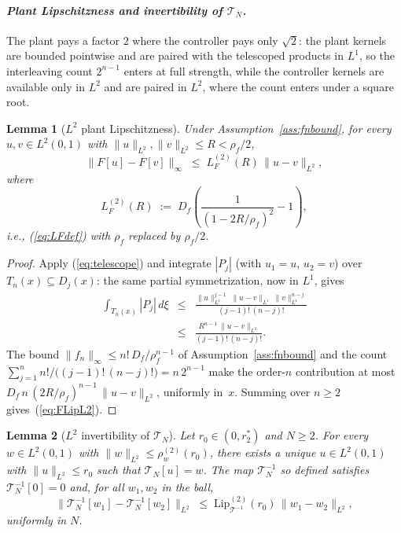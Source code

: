 \documentclass[10pt,a4paper]{amsart}
\newtheorem{lemma}{Lemma}
\newcommand{\Tcal}{\mathcal{T}}
\newcommand{\Ltwo}{L^2}
\newcommand{\LipT}{\mathrm{Lip}_{\Tcal^{-1}}}
\begin{document}
\paragraph*{\normalfont\em Plant Lipschitzness and invertibility of $\Tcal_N$.}
The plant pays a factor $2$ where the controller pays only $\sqrt{2}$: the plant kernels are bounded pointwise and are paired with the telescoped products in $L^1$, so the interleaving count $2^{n-1}$ enters at full strength, while the controller kernels are available only in $\Ltwo$ and are paired in $\Ltwo$, where the count enters under a square root.

\begin{lemma}[$\Ltwo$ plant Lipschitzness]\label{lem:FLipL2}
Under Assumption~\ref{ass:fnbound}, for every $u, v \in \Ltwo(0,1)$ with $\|u\|_{\Ltwo}, \|v\|_{\Ltwo} \le R < \rho_f/2$,
\begin{equation}
\|F[u] - F[v]\|_\infty \;\le\; L_F^{(2)}(R)\,\|u - v\|_{\Ltwo},
\label{eq:FLipL2}
\end{equation}
where
\begin{equation}
L_F^{(2)}(R) \;:=\; D_f\!\left(\frac{1}{(1 - 2R/\rho_f)^2} - 1\right),
\label{eq:LF2def}
\end{equation}
i.e., (\ref{eq:LFdef}) with $\rho_f$ replaced by $\rho_f/2$.
\end{lemma}

\begin{proof}
Apply (\ref{eq:telescope}) and integrate $|P_j|$ (with $u_1 = u$, $u_2 = v$) over $T_n(x) \subseteq D_j(x)$: the same partial symmetrization, now in $L^1$, gives
\begin{eqnarray}
\int_{T_n(x)} |P_j|\, d\xi &\le& \frac{\|u\|_{L^1}^{j-1}\; \|u - v\|_{L^1}\; \|v\|_{L^1}^{n-j}}{(j-1)!\,(n-j)!} \nonumber \\
&\le& \frac{R^{n-1}\,\|u - v\|_{\Ltwo}}{(j-1)!\,(n-j)!}.
\label{eq:blockL1}
\end{eqnarray}
The bound $\|f_n\|_\infty \le n!\, D_f/\rho_f^{n-1}$ of Assumption~\ref{ass:fnbound} and the count $\sum_{j=1}^n n!/\bigl((j-1)!\,(n-j)!\bigr) = n\, 2^{n-1}$ make the order-$n$ contribution at most $D_f\, n\, (2R/\rho_f)^{n-1}\, \|u - v\|_{\Ltwo}$, uniformly in~$x$. Summing over $n \ge 2$ gives~(\ref{eq:FLipL2}).
\end{proof}

\begin{lemma}[$\Ltwo$ invertibility of $\Tcal_N$]\label{lem:TNinv}
Let $r_0 \in (0, r_2^*)$ and $N \ge 2$. For every $w \in \Ltwo(0,1)$ with $\|w\|_{\Ltwo} \le \rho_w^{(2)}(r_0)$, there exists a unique $u \in \Ltwo(0,1)$ with $\|u\|_{\Ltwo} \le r_0$ such that $\Tcal_N[u] = w$. The map $\Tcal_N^{-1}$ so defined satisfies $\Tcal_N^{-1}[0] = 0$ and, for all $w_1, w_2$ in the ball,
\begin{equation}
\bigl\|\Tcal_N^{-1}[w_1] - \Tcal_N^{-1}[w_2]\bigr\|_{\Ltwo} \;\le\; \LipT^{(2)}(r_0)\, \|w_1 - w_2\|_{\Ltwo},
\label{eq:TNinvLip}
\end{equation}
uniformly in $N$.
\end{lemma}
\end{document}
